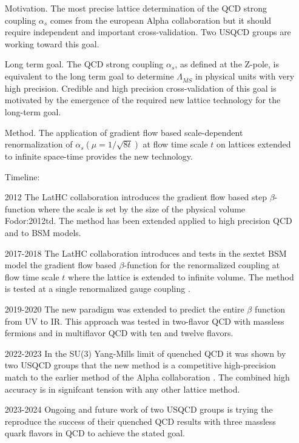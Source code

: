 \documentclass[prd,showpacs,showkeys,preprintnumbers,floatfix,
nofootinbib%
]{revtex4-2}
\begin{document}
\begin{itemize}
	\item[Motivation.]  The most precise lattice determination of the QCD strong coupling $\alpha_s$  comes from the european Alpha collaboration but  it should require independent and important  cross-validation. Two  USQCD  groups are working toward  this goal.
	\item[Long term goal.] The QCD strong coupling $\alpha_s$, as defined at the Z-pole, is equivalent to the long term goal to determine $\Lambda_{\overline{MS}}$  in physical units with very high precision. Credible and high precision cross-validation  of this goal  is motivated by the emergence of  the required new lattice  technology for the long-term goal.
	\item[Method.]  The application of gradient flow based scale-dependent renormalization of $\alpha_s(\mu=1/\sqrt{8t})$ at flow time scale $t$ on lattices extended to  infinite space-time provides the new technology. 
	\item[Timeline:]
	\item[2012] The LatHC collaboration introduces the gradient flow based step $\beta$-function where the scale is set by the size of the physical volume Fodor:2012td. The method  has been extended  applied to high precision QCD and to BSM models. 
	\item[2017-2018] The LatHC collaboration introduces and tests in the sextet BSM model the  gradient flow based  $\beta$-function for the renormalized coupling at flow time scale $t$ where the lattice is extended to infinite volume.  The method is tested at a single renormalized gauge coupling \cite{Fodor:2017die}. 
	\item[2019-2020] The new paradigm was extended to predict the entire $\beta$ function from UV to IR. This approach was tested in two-flavor QCD with massless fermions\cite{Hasenfratz:2019hpg} and in multiflavor QCD with ten and twelve flavors.
	\item[2022-2023] In the SU(3) Yang-Mills limit of quenched QCD it was shown by two USQCD groups that the new method is a competitive high-precision match to the earlier method of the Alpha collaboration \cite{Hasenfratz:2023bok,Wong:2023jvr}. The combined high accuracy is in signifcant tension with any other lattice method.
		\item[2023-2024]  Ongoing and future work of two USQCD groups is trying the reproduce the success of their quenched QCD results with three massless quark flavors in QCD to achieve the stated  goal. 
	
\end{itemize}
\end{document}
